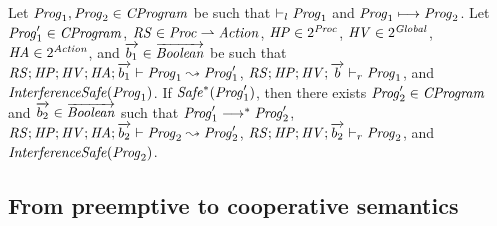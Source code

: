 \begin{lemma}
Let $\mathit{Prog}_1,\mathit{Prog}_2 \in \mathit{CProgram}$ be such that $\vdash_l \mathit{Prog}_1$ and $\mathit{Prog}_1 \longmapsto \mathit{Prog}_2$.
Let $\mathit{Prog}'_1 \in \mathit{CProgram}$, $\mathit{RS} \in \mathit{Proc} \rightharpoonup \mathit{Action}$, $\mathit{HP} \in 2^{\mathit{Proc}}$, $\mathit{HV} \in 2^{\mathit{Global}}$, $\mathit{HA} \in 2^{\mathit{Action}}$,
and $\overrightarrow{b_1} \in \overrightarrow{\mathit{Boolean}}$ be such that 
$\mathit{RS};\mathit{HP};\mathit{HV};\mathit{HA};\overrightarrow{b_1} \vdash \mathit{Prog}_1 \leadsto \mathit{Prog}'_1$, $\mathit{RS};\mathit{HP};\mathit{HV};\overrightarrow{b} \vdash_r \mathit{Prog}_1$, and
$\mathit{InterferenceSafe}(\mathit{Prog}_1)$.
If $\mathit{Safe}^*(\mathit{Prog}'_1)$, then there exists $\mathit{Prog}'_2 \in \mathit{CProgram}$ and $\overrightarrow{b_2} \in \overrightarrow{\mathit{Boolean}}$ such that 
$\mathit{Prog}'_1 \longrightarrow^* \mathit{Prog}'_2$, $\mathit{RS};\mathit{HP};\mathit{HV};\mathit{HA};\overrightarrow{b_2} \vdash \mathit{Prog}_2 \leadsto \mathit{Prog}'_2$, 
$\mathit{RS};\mathit{HP};\mathit{HV};\overrightarrow{b_2} \vdash_r \mathit{Prog}_2$, and $\mathit{InterferenceSafe}(\mathit{Prog}_2)$.
\end{lemma}


\subsection{From preemptive to cooperative semantics}
\label{sec:yield-sufficiency}

